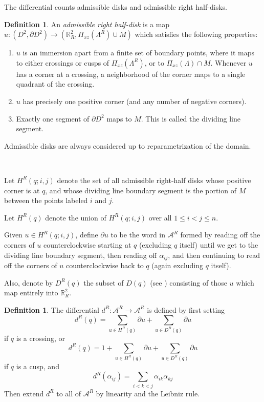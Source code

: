 \documentclass[a4paper,final, reqno]{amsart}
\theoremstyle{plain}
\theoremstyle{definition}
\newtheorem{Def}[Th]{Definition}
\newcommand{\A}{\mathcal{A}}
\begin{document}
	
	The differential counts admissible disks and admissible right half-disks.
	
	\begin{Def}
		An \emph{admissible right half-disk} is a map $u: (D^2, \partial D^2) \to (\mathbb{R}^2_R, \Pi_{xz}(\Lambda^R) \cup M)$ which satisfies the following properties:
		
		\begin{enumerate}
			\item $u$ is an immersion apart from a finite set of boundary points, where it maps to either crossings or cusps of $\Pi_{xz}(\Lambda^R)$, or to $\Pi_{xz}(\Lambda) \cap M$. Whenever $u$ has a corner at a crossing, a neighborhood of the corner maps to a single quadrant of the crossing.
			\item $u$ has precisely one positive corner (and any number of negative corners).
			\item Exactly one segment of $\partial D^2$ maps to $M$. This is called the dividing line segment.
		\end{enumerate}
		
		Admissible disks are always considered up to reparametrization of the domain.
		
		\-\
		
		Let $H^R(q; i,j)$ denote the set of all admissible right-half disks whose positive corner is at $q$, and whose dividing line boundary segment is the portion of $M$ between the points labeled $i$ and $j$. 
		
		Let $H^R(q)$ denote the union of $H^R(q;i,j)$ over all $1\leq i<j\leq n$.
		
		Given $u \in H^R(q; i,j)$, define $\partial u$ to be the word in $\A^R$ formed by reading off the corners of $u$ counterclockwise starting at $q$ (excluding $q$ itself) until we get to the dividing line boundary segment, then reading off $\alpha_{ij}$, and then continuing to read off the corners of $u$ counterclockwise back to $q$ (again excluding $q$ itself).
	\end{Def}
	
	
	
	
	
		
	Also, denote by $D^R(q)$ the subset of $D(q)$ (see ) consisting of those $u$ which map entirely into $\mathbb{R}^2_R$. 
	
	
	\begin{Def}
		The differential $d^R: \A^R \to \A^R$ is defined by first setting
		\[ d^R(q) = \sum_{u \in H^R(q)} \partial u + \sum_{u \in D^R(q)} \partial u\]
		if $q$ is a crossing, or
		\[ d^R(q) = 1 + \sum_{u \in H^R(q)} \partial u + \sum_{u \in D^R(q)} \partial u\]
		if $q$ is a cusp, and 
		\[ d^R(\alpha_{ij}) = \sum_{i<k<j} \alpha_{ik}\alpha_{kj} \]
		Then extend $d^R$ to all of $\A^R$ by linearity and the Leibniz rule.
	\end{Def}
	
\end{document}
